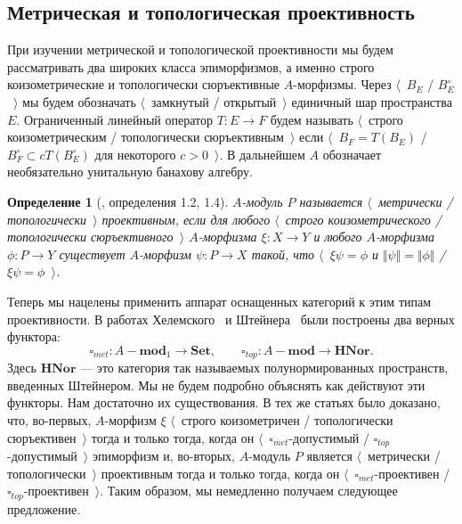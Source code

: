 \documentclass[12pt]{article}
\newtheorem{definition}[theorem]{Определение}
\begin{document}

\subsection{Метрическая и топологическая
    проективность}\label{SubSectionMetricAndTopologicalProjectivity}

При изучении метрической и топологической проективности мы будем рассматривать
два широких класса эпиморфизмов, а именно строго коизометрические и
топологически сюръективные $A$-морфизмы. Через $\langle$~$B_E$ /
$B_E^\circ$~$\rangle$ мы будем обозначать $\langle$~замкнутый /
открытый~$\rangle$ единичный шар пространства $E$. Ограниченный линейный
оператор $T:E\to F$ будем называть $\langle$~строго коизометрическим /
топологически сюръективным~$\rangle$ если $\langle$~$B_F=T(B_E)$ /
$B_F^\circ\subset cT(B_E^\circ)$ для некоторого $c>0$~$\rangle$. В дальнейшем
$A$ обозначает необязательно унитальную банахову алгебру.

\begin{definition}[\cite{HelMetrFrQMod}, определения 1.2,
        1.4]\label{MetTopProjMod} $A$-модуль $P$ называется $\langle$~метрически
    / топологически~$\rangle$ проективным, если для любого $\langle$~строго
    коизометрического / топологически сюръективного~$\rangle$ $A$-морфизма
    $\xi:X\to Y$ и любого $A$-морфизма $\phi:P\to Y$ существует $A$-морфизм
    $\psi:P\to X$ такой, что $\langle$~$\xi\psi=\phi$ и
    $\Vert\psi\Vert=\Vert\phi\Vert$ / $\xi\psi=\phi$~$\rangle$.
\end{definition}

Теперь мы нацелены применить аппарат оснащенных категорий к этим типам
проективности. В работах Хелемского~\cite{HelMetrFrQMod} и
Штейнера~\cite{ShtTopFrClassicQuantMod} были построены два верных функтора:
$$
    \square_{met}:A-\mathbf{mod}_1\to\mathbf{Set},
    \qquad
    \square_{top}:A-\mathbf{mod}\to\mathbf{HNor}.
$$
Здесь $\mathbf{HNor}$ --- это категория так называемых полунормированных
пространств, введенных Штейнером. Мы не будем подробно объяснять как действуют
эти функторы. Нам достаточно их существования. В тех же статьях было доказано,
что, во-первых, $A$-морфизм $\xi$ $\langle$~строго коизометричен / топологически
сюръективен~$\rangle$ тогда и только тогда, когда он
$\langle$~$\square_{met}$-допустимый / $\square_{top}$-допустимый~$\rangle$
эпиморфизм и, во-вторых, $A$-модуль $P$ является $\langle$~метрически /
топологически~$\rangle$ проективным тогда и только тогда, когда он
$\langle$~$\square_{met}$-проективен / $\square_{top}$-проективен~$\rangle$.
Таким образом, мы немедленно получаем следующее предложение.
\end{document}
